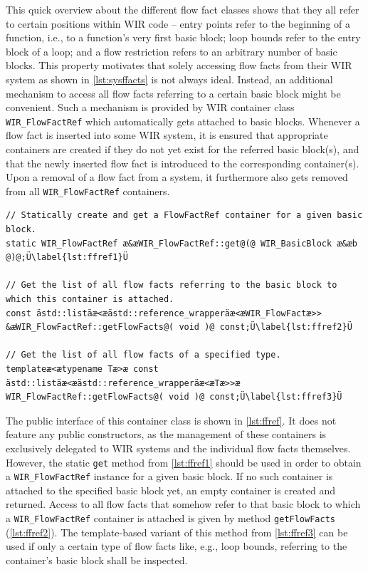 This quick overview about the different flow fact classes shows that they all refer to certain positions within \gls{WIR} code -- entry points refer to the beginning of a function, i.e., to a function's very first basic block; loop bounds refer to the entry block of a loop; and a flow restriction refers to an arbitrary number of basic blocks.
This property motivates that solely accessing flow facts from their \gls{WIR} system as shown in \cref{lst:sysffacts} is not always ideal.
Instead, an additional mechanism to access all flow facts referring to a certain basic block might be convenient.
Such a mechanism is provided by \gls{WIR} container class \texttt{WIR\_FlowFactRef} which automatically gets attached to basic blocks.
Whenever a flow fact is inserted into some \gls{WIR} system, it is ensured that appropriate containers are created if they do not yet exist for the referred basic block(s), and that the newly inserted flow fact is introduced to the corresponding container(s).
Upon a removal of a flow fact from a system, it furthermore also gets removed from all \texttt{WIR\_FlowFactRef} containers.

\begin{lstlisting}[style=code,float=t,caption={Flow Fact Handling of Container Class \texttt{WIR\_FlowFactRef}},label=lst:ffref]
// Statically create and get a FlowFactRef container for a given basic block.
static WIR_FlowFactRef æ&æWIR_FlowFactRef::get@(@ WIR_BasicBlock æ&æb @)@;Ü\label{lst:ffref1}Ü

// Get the list of all flow facts referring to the basic block to which this container is attached.
const ästd::listäæ<æästd::reference_wrapperäæ<æWIR_FlowFactæ>> &æWIR_FlowFactRef::getFlowFacts@( void )@ const;Ü\label{lst:ffref2}Ü

// Get the list of all flow facts of a specified type.
templateæ<ætypename Tæ>æ const ästd::listäæ<æästd::reference_wrapperäæ<æTæ>>æ WIR_FlowFactRef::getFlowFacts@( void )@ const;Ü\label{lst:ffref3}Ü
\end{lstlisting}

The public interface of this container class is shown in \cref{lst:ffref}.
It does not feature any public constructors, as the management of these containers is exclusively delegated to \gls{WIR} systems and the individual flow facts themselves.
However, the static \texttt{get} method from \cref{lst:ffref1} should be used in order to obtain a \texttt{WIR\_FlowFactRef} instance for a given basic block.
If no such container is attached to the specified basic block yet, an empty container is created and returned.
Access to all flow facts that somehow refer to that basic block to which a \texttt{WIR\_FlowFactRef} container is attached is given by method \texttt{getFlowFacts} (\cref{lst:ffref2}).
The template-based variant of this method from \cref{lst:ffref3} can be used if only a certain type of flow facts like, e.g., loop bounds, referring to the container's basic block shall be inspected.


